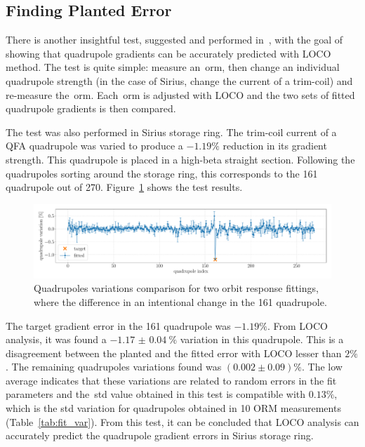 \subsection{Finding Planted Error}
There is another insightful test, suggested and performed in~\cite{safranek1995}, with the goal of showing that quadrupole gradients can be accurately predicted with LOCO method. The test is quite simple: measure an~\gls{orm}, then change an individual quadrupole strength (in the case of Sirius, change the current of a trim-coil) and re-measure the~\gls{orm}. Each~\gls{orm} is adjusted with LOCO and the two sets of fitted quadrupole gradients is then compared.

The test was also performed in Sirius storage ring. The trim-coil current of a QFA quadrupole was varied to produce a $-1.19\%$ reduction in its gradient strength. This quadrupole is placed in a high-beta straight section. Following the quadrupoles sorting around the storage ring, this corresponds to the 161 quadrupole out of 270. Figure~\ref{fig:delta_13M1_qfa} shows the test results.
\begin{figure}[h!]
\centering
\includegraphics[width=1.0\textwidth]{figures/delta_13M1_QFA_errorbar.pdf}
\caption{Quadrupoles variations comparison for two orbit response fittings, where the difference in an intentional change in the 161 quadrupole.}
\label{fig:delta_13M1_qfa}
\end{figure}

The target gradient error in the 161 quadrupole was $-1.19\%$. From LOCO analysis, it was found a $\SI{-1.17(4)}{\%}$ variation in this quadrupole. This is a disagreement between the planted and the fitted error with LOCO lesser than $2\%$. The remaining quadrupoles variations found was $\left(0.002\pm 0.09\right)\%$. The low average indicates that these variations are related to random errors in the fit parameters and the~\gls{std} value obtained in this test is compatible with $0.13\%$, which is the std variation for quadrupoles obtained in 10 ORM measurements (Table~\ref{tab:fit_var}). From this test, it can be concluded that LOCO analysis can accurately predict the quadrupole gradient errors in Sirius storage ring. 

